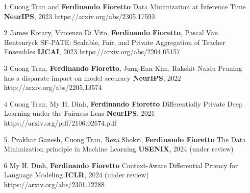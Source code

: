\documentclass[localFont,alternative]{documentMETADATA}
\begin{document}
\begin{pubs}

	\confentryShort
	{1}
	{{Cuong Tran} and {\bf Ferdinando Fioretto}}
	{Data Minimization at Inference Time}
	{\textbf{NeurIPS}, 2023}
	{https://arxiv.org/abs/2305.17593}
	
	\confentryShort
  {2} %
  {{James Kotary}, {Vincenzo Di Vito}, {\bf Ferdinando Fioretto}, Pascal Van Hentenryck}
	{SF-PATE: Scalable, Fair, and Private Aggregation of Teacher Ensembles}
  {\textbf{IJCAI}, 2023}
	{https://arxiv.org/abs/2204.05157}

	\confentryShort
	{3}
	{{Cuong Tran}, {\bf Ferdinando Fioretto}, Jung-Eun Kim, {Rakshit Naidu}}
	{Pruning has a disparate impact on model accuracy}
	{\textbf{NeurIPS}, 2022}
	{http://arxiv.org/abs/2205.13574}

	\confentryShort
	{4} %
	{{Cuong Tran}, {My H. Dinh}, {\bf Ferdinando Fioretto}}
	{Differentially Private Deep Learning under the Fairness Lens}
	{\textbf{NeurIPS}, 2021}
	{https://arxiv.org/pdf/2106.02674.pdf}

	\confentryShort
	{5.}
	{Prakhar Ganesh, {Cuong Tran}, Reza Shokri, {\bf Ferdinando Fioretto}}
	{The Data Minimization principle in Machine Learning}
	{\textbf{USENIX}, 2024 (under review)}
	{}

	\confentryShort
	{6}%
	{{My H. Dinh}, {\bf Ferdinando Fioretto}}
	{Context-Aware Differential Privacy for Language Modeling}
	{\textbf{ICLR}, 2024 (under review)}
	{https://arxiv.org/abs/2301.12288}

\end{pubs}

\vspace{-2pt}
\vspace{-6pt}
\end{document}
